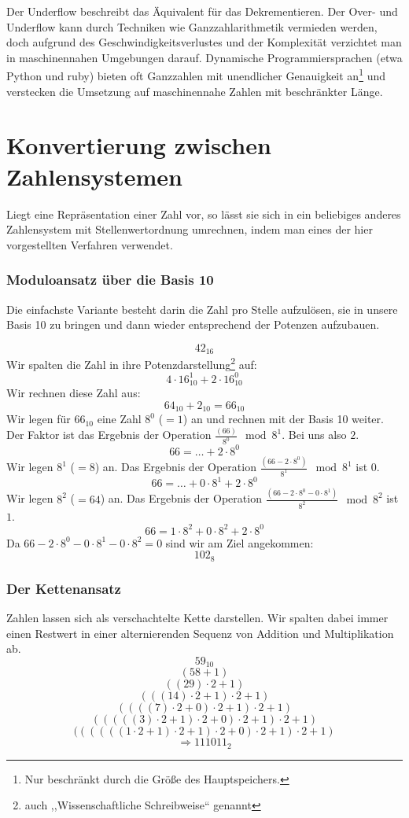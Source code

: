 Der Underflow beschreibt das Äquivalent für das Dekrementieren.
Der Over- und Underflow kann durch Techniken wie Ganzzahlarithmetik vermieden
werden, doch aufgrund des Geschwindigkeitsverlustes und der Komplexität
verzichtet man in maschinennahen Umgebungen darauf. Dynamische Programmiersprachen
(etwa Python und ruby) bieten oft Ganzzahlen mit unendlicher Genauigkeit
an\footnote{Nur beschränkt durch die Größe des Hauptspeichers.} und verstecken
die Umsetzung auf maschinennahe Zahlen mit beschränkter Länge.
%
\section{Konvertierung zwischen Zahlensystemen}
%
Liegt eine Repräsentation einer Zahl vor, so lässt sie sich in ein beliebiges
anderes Zahlensystem mit Stellenwertordnung umrechnen, indem man eines der
hier vorgestellten Verfahren verwendet.
%
\subsubsection{Moduloansatz über die Basis 10}
%
Die einfachste Variante besteht darin die Zahl pro Stelle aufzulösen,
sie in unsere Basis 10 zu bringen und dann wieder entsprechend der Potenzen
aufzubauen.

\[ 42_{16} \]
%
Wir spalten die Zahl in ihre Potenzdarstellung\footnote{%
auch ,,Wissenschaftliche Schreibweise`` genannt} auf:
\[ 4\cdot 16_{10}^1 + 2\cdot 16_{10}^0 \]
%
Wir rechnen diese Zahl aus:
\[ 64_{10} + 2_{10} = 66_{10} \]
%
Wir legen für $66_{10}$ eine Zahl $8^0$ ($=1$) an und rechnen mit der Basis 10 weiter.
Der Faktor ist das Ergebnis der Operation $\frac{(66)}{8^0}\mod{8^1}$.
Bei uns also $2$.
\[ 66 = \ldots + 2\cdot 8^0 \]
%
Wir legen $8^1$ ($=8$) an. Das Ergebnis der Operation
$\frac{(66-2\cdot8^0)}{8^1}\mod{8^1}$ ist $0$.
\[ 66 = \ldots + 0\cdot 8^1 + 2\cdot 8^0 \]
%
Wir legen $8^2$ ($=64$) an. Das Ergebnis der Operation
$\frac{(66-2\cdot8^0-0\cdot8^1)}{8^2}\mod{8^2}$ ist $1$.
\[ 66 = 1\cdot8^2 + 0\cdot8^2 + 2\cdot8^0 \]
%
Da $66-2\cdot8^0-0\cdot8^1-0\cdot8^2 = 0$ sind wir am Ziel angekommen:
\[ 102_{8} \]

\subsubsection{Der Kettenansatz}
%
Zahlen lassen sich als verschachtelte Kette darstellen.
Wir spalten dabei immer einen Restwert in einer alternierenden
Sequenz von Addition und Multiplikation ab.
%
\[
  59_{10}
\] \[
  (58 + 1)
\] \[
  ((29)\cdot2 + 1)
\] \[
  (((14)\cdot2 + 1)\cdot2 + 1)
\] \[
  ((((7)\cdot2 + 0)\cdot2 + 1)\cdot2 + 1)
\] \[
  (((((3)\cdot2 + 1)\cdot2 + 0)\cdot2 + 1)\cdot2 + 1)
\] \[
  ((((((1\cdot2 + 1)\cdot2 + 1)\cdot2 + 0)\cdot2 + 1)\cdot2 + 1)
\] \[
  \Rightarrow 111011_2
\]

